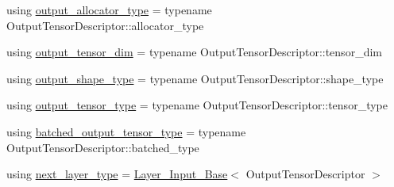 \begin{DoxyCompactItemize}
using \hyperlink{structbc_1_1nn_1_1Layer__Output__Base_a7cde98d6bf97cd5bc4aef4039ee26536}{output\+\_\+allocator\+\_\+type} = typename Output\+Tensor\+Descriptor\+::allocator\+\_\+type
\item 
using \hyperlink{structbc_1_1nn_1_1Layer__Output__Base_a52a461f65c3b8ae04ae445723a334e13}{output\+\_\+tensor\+\_\+dim} = typename Output\+Tensor\+Descriptor\+::tensor\+\_\+dim
\item 
using \hyperlink{structbc_1_1nn_1_1Layer__Output__Base_a62aab794fb2d836a215498128a7ad9b7}{output\+\_\+shape\+\_\+type} = typename Output\+Tensor\+Descriptor\+::shape\+\_\+type
\item 
using \hyperlink{structbc_1_1nn_1_1Layer__Output__Base_ad5c59df910c120620708a0cf9c90e89a}{output\+\_\+tensor\+\_\+type} = typename Output\+Tensor\+Descriptor\+::tensor\+\_\+type
\item 
using \hyperlink{structbc_1_1nn_1_1Layer__Output__Base_a1de6ba739a49078d6cc6d169e85e8d4f}{batched\+\_\+output\+\_\+tensor\+\_\+type} = typename Output\+Tensor\+Descriptor\+::batched\+\_\+type
\item 
using \hyperlink{structbc_1_1nn_1_1Layer__Output__Base_a0c791bc57bcc78e8d82e8a5375f1c584}{next\+\_\+layer\+\_\+type} = \hyperlink{classbc_1_1nn_1_1Layer__Input__Base}{Layer\+\_\+\+Input\+\_\+\+Base}$<$ Output\+Tensor\+Descriptor $>$
\end{DoxyCompactItemize}
